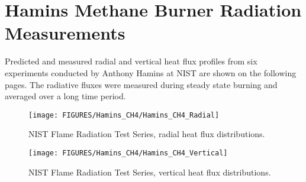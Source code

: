 \clearpage

\section{Hamins Methane Burner Radiation Measurements}

Predicted and measured radial and vertical heat flux profiles from six experiments conducted by Anthony Hamins at NIST are shown on the following pages.
The radiative fluxes were measured during steady state burning and averaged over a long time period.

\begin{figure}
\begin{center}
\texttt{[image: FIGURES/Hamins\_CH4/Hamins\_CH4\_Radial]}
\caption{NIST Flame Radiation Test Series, radial heat flux distributions.}
\label{Hamins_CH4_Radial}
\end{center}

\end{figure}
\begin{figure}
\begin{center}
\texttt{[image: FIGURES/Hamins\_CH4/Hamins\_CH4\_Vertical]}
\caption{NIST Flame Radiation Test Series, vertical heat flux distributions.}
\label{Hamins_CH4_Vertical}
\end{center}
\end{figure}


\clearpage
